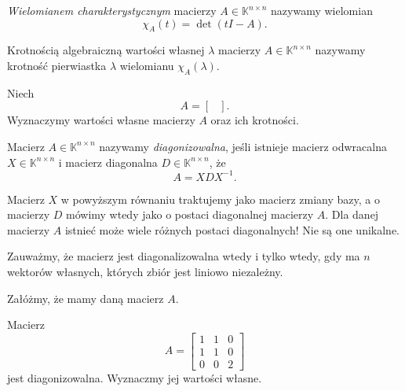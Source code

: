 \begin{definition}
	\textit{Wielomianem charakterystycznym} macierzy $A \in \mathbb{K}^{n \times n}$
		nazywamy wielomian
	\begin{equation}
		\chi_A(t) = \det(t I - A).
	\end{equation}
\end{definition}

\begin{definition}
	Krotnością algebraiczną wartości własnej $\lambda$ macierzy $A \in \mathbb{K}^{n \times n}$
		nazywamy krotność pierwiastka $\lambda$ wielomianu $\chi_A(\lambda)$.
\end{definition}

\begin{example}
	Niech
	\begin{equation}
		A = \left[\begin{matrix}
		\end{matrix}\right].
	\end{equation}
	Wyznaczymy wartości własne macierzy $A$ oraz ich krotności.
\end{example}



\begin{definition}
	Macierz $A \in \mathbb{K}^{n \times n}$ nazywamy \textit{diagonizowalna},
		jeśli istnieje macierz odwracalna $X \in \mathbb{K}^{n \times n}$
		i macierz diagonalna $D \in \mathbb{K}^{n \times n}$,
		że
	\begin{equation}
		A = X D X^{-1}.
	\end{equation}
\end{definition}
Macierz $X$ w powyższym równaniu traktujemy jako macierz zmiany bazy,
	a o macierzy $D$ mówimy wtedy jako o postaci diagonalnej macierzy $A$.
Dla danej macierzy $A$ istnieć może wiele różnych postaci diagonalnych!
Nie są one unikalne.

Zauważmy,
	że macierz jest diagonalizowalna wtedy i tylko wtedy,
	gdy ma $n$ wektorów własnych,
	których zbiór jest liniowo niezależny.

Załóżmy,
	że mamy daną macierz $A$.


\begin{example}
	Macierz
	\begin{equation}
		A = \left[\begin{matrix}
			1 & 1 & 0 \\
			1 & 1 & 0 \\
			0 & 0 & 2
		\end{matrix}\right]
	\end{equation}
	jest diagonizowalna.
	Wyznaczmy jej wartości własne.
\end{example}

